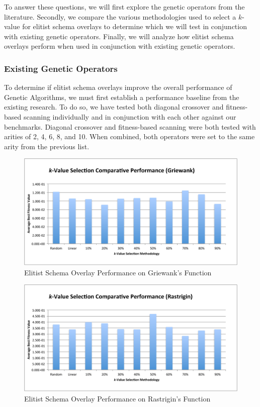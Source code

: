 To answer these questions, we will first explore the genetic operators from the literature. Secondly, we compare the various methodologies used to select a $k$-value for elitist schema overlays to determine which we will test in conjunction with existing genetic operators. Finally, we will analyze how elitist schema overlays perform when used in conjunction with existing genetic operators.

\subsubsection*{Existing Genetic Operators}
To determine if elitist schema overlays improve the overall performance of Genetic Algorithms, we must first establish a performance baseline from the existing research. To do so, we have tested both diagonal crossover and fitness-based scanning individually and in conjunction with each other against our benchmarks. Diagonal crossover and fitness-based scanning were both tested with arities of 2, 4, 6, 8, and 10. When combined, both operators were set to the same arity from the previous list. 

\begin{figure}[htbp]
\centering
\includegraphics[scale=0.60]{charts/ESO_Griewank.pdf}
\caption{Elitist Schema Overlay Performance on Griewank's Function}
\label{fig:eso_griewank}
\end{figure}

\begin{figure}[htbp]
\centering
\includegraphics[scale=0.60]{charts/ESO_Rastrigin.pdf}
\caption{Elitist Schema Overlay Performance on Rastrigin's Function}
\label{fig:eso_rastrigin}
\end{figure}

